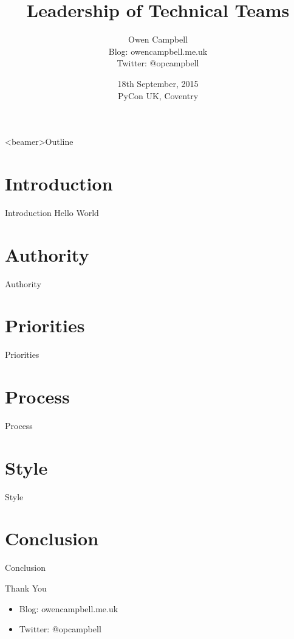 \documentclass{beamer}
\title{Leadership of Technical Teams}
\author{
  Owen Campbell\\
  Blog: owencampbell.me.uk\\
  Twitter: @opcampbell\\
}
\date[PyCon UK 2015]{18th September, 2015\\PyCon UK, Coventry}
\begin{document}
\begin{frame}
  \titlepage{}
\end{frame}

{
  \begin{frame}<beamer>{Outline}
    \tableofcontents
  \end{frame}
}

  \section{Introduction}

    \begin{frame}{Introduction}
      Hello World
    \end{frame}


  \section{Authority}

    \begin{frame}{Authority}
    \end{frame}

  \section{Priorities}

    \begin{frame}{Priorities}
    \end{frame}

  \section{Process}

    \begin{frame}{Process}
    \end{frame}

  \section{Style}

    \begin{frame}{Style}
    \end{frame}

  \section{Conclusion}

    \begin{frame}{Conclusion}
    \end{frame}

    \begin{frame}{Thank You}
      \begin{itemize}
        \item Blog: owencampbell.me.uk
        \item Twitter: @opcampbell
      \end{itemize}
    \end{frame}
\end{document}
